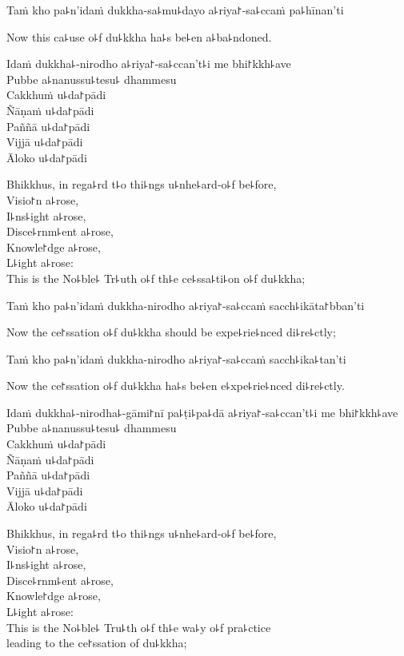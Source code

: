 Taṁ kho pa꜕n'idaṁ dukkha-sa꜕mu꜕dayo a꜕riya꜓-sa꜕ccaṁ pa꜕hīnan'ti

\begin{english}
  Now this ca꜕use o꜕f du꜕kkha ha꜕s be꜕en a꜕ba꜕ndoned.
\end{english}

Idaṁ dukkha꜕-nirodho a꜕riya꜓-sa꜕ccan't꜕i me bhi꜓kkh꜕ave\\
Pubbe a꜕nanussu꜕tesu꜕ dhammesu\\
Cakkhuṁ u꜕da꜓pādi\\
Ñāṇaṁ u꜕da꜓pādi\\
Paññā u꜕da꜓pādi\\
Vijjā u꜕da꜓pādi\\
Āloko u꜕da꜓pādi

\begin{english}
  Bhikkhus, in rega꜕rd t꜕o thi꜕ngs u꜕nhe꜕ard-o꜕f be꜕fore,\\
  Visio꜓n a꜕rose,\\
  I꜕ns꜕ight a꜕rose,\\
  Disce꜕rnm꜕ent a꜕rose,\\
  Knowle꜓dge a꜕rose,\\
  L꜕ight a꜕rose:\\
  This is the No꜕ble꜕ Tr꜕uth o꜕f th꜕e ce꜕ssa꜕ti꜕on o꜕f du꜕kkha;
\end{english}

Taṁ kho pa꜕n'idaṁ dukkha-nirodho a꜕riya꜓-sa꜕ccaṁ sacch꜕ikāta꜓bban'ti

\begin{english}
  Now the ce꜓ssation o꜕f du꜕kkha should be expe꜕rie꜕nced di꜕re꜕ctly;
\end{english}

Taṁ kho pa꜕n'idaṁ dukkha-nirodho a꜕riya꜓-sa꜕ccaṁ sacch꜕ika꜕tan'ti

\begin{english}
  Now the ce꜓ssation o꜕f du꜕kkha ha꜕s be꜕en e꜕xpe꜕rie꜕nced di꜕re꜕ctly.
\end{english}

Idaṁ dukkha꜕-nirodha꜕-gāmi꜓nī pa꜕ṭi꜕pa꜕dā a꜕riya꜓-sa꜕ccan't꜕i me bhi꜓kkh꜕ave\\
Pubbe a꜕nanussu꜕tesu꜕ dhammesu\\
Cakkhuṁ u꜕da꜓pādi\\
Ñāṇaṁ u꜕da꜓pādi\\
Paññā u꜕da꜓pādi\\
Vijjā u꜕da꜓pādi\\
Āloko u꜕da꜓pādi

\begin{english}
  Bhikkhus, in rega꜕rd t꜕o thi꜕ngs u꜕nhe꜕ard-o꜕f be꜕fore,\\
  Visio꜓n a꜕rose,\\
  I꜕ns꜕ight a꜕rose,\\
  Disce꜕rnm꜕ent a꜕rose,\\
  Knowle꜓dge a꜕rose,\\
  L꜕ight a꜕rose:\\
  \ifaivedition
  \clearpage
  \fi
  This is the No꜕ble꜕ Tru꜕th o꜕f th꜕e wa꜕y o꜕f pra꜕ctice\\
  leading to the ce꜓ssation of du꜕kkha;
\end{english}

